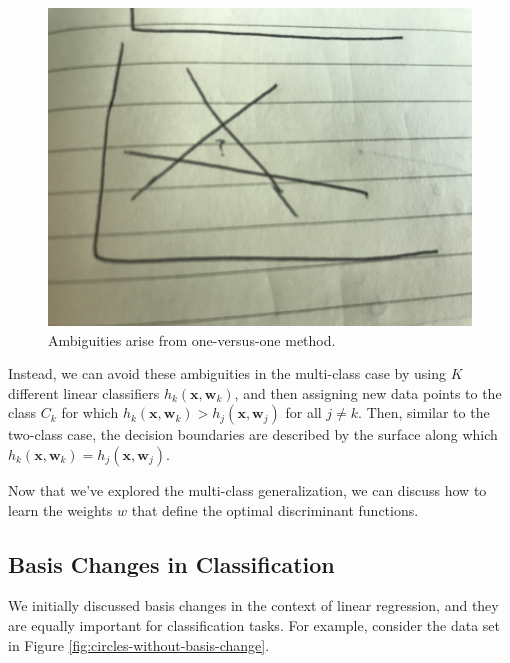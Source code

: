 \begin{figure}
    \centering
    \includegraphics[width=0.5\paperwidth]{../Classification/fig/one_vs_one_ambig.jpg}
    \caption{Ambiguities arise from one-versus-one method.}
    \label{fig:one-vs-one-ambig}
\end{figure}

Instead, we can avoid these ambiguities in the multi-class case by using $K$ different linear classifiers $h_{k}(\textbf{x}, \textbf{w}_{k})$, and then assigning new data points to the class $C_{k}$ for which $h_{k}(\textbf{x}, \textbf{w}_{k}) > h_{j}(\textbf{x}, \textbf{w}_{j})$ for all $j \neq k$. Then, similar to the two-class case, the decision boundaries are described by the surface along which $h_{k}(\textbf{x}, \textbf{w}_{k}) = h_{j}(\textbf{x}, \textbf{w}_{j})$.

Now that we've explored the multi-class generalization, we can discuss how to learn the weights $w$ that define the optimal discriminant functions.

\subsection{Basis Changes in Classification}
We initially discussed basis changes in the context of linear regression, and they are equally important for classification tasks. For example, consider the data set in Figure \ref{fig:circles-without-basis-change}.

